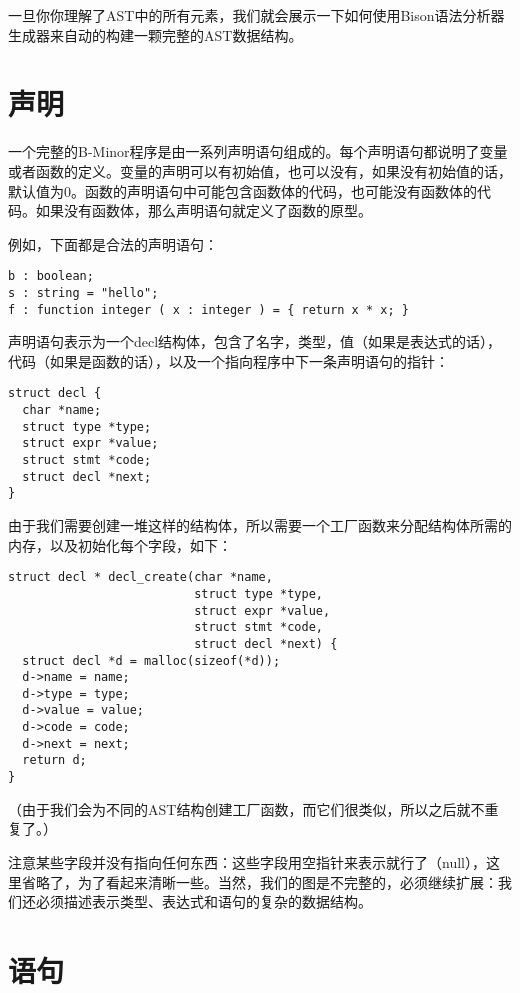 \documentclass[cn,11pt,chinese]{elegantbook}
\begin{document}
一旦你你理解了AST中的所有元素，我们就会展示一下如何使用Bison语法分析器生成器来自动的构建一颗完整的AST数据结构。

\section{声明}

一个完整的B-Minor程序是由一系列声明语句组成的。每个声明语句都说明了变量或者函数的定义。变量的声明可以有初始值，也可以没有，如果没有初始值的话，默认值为0。函数的声明语句中可能包含函数体的代码，也可能没有函数体的代码。如果没有函数体，那么声明语句就定义了函数的原型。

例如，下面都是合法的声明语句：

\begin{verbatim}
b : boolean;
s : string = "hello";
f : function integer ( x : integer ) = { return x * x; }
\end{verbatim}

声明语句表示为一个decl结构体，包含了名字，类型，值（如果是表达式的话），代码（如果是函数的话），以及一个指向程序中下一条声明语句的指针：

\begin{verbatim}
struct decl {
  char *name;
  struct type *type;
  struct expr *value;
  struct stmt *code;
  struct decl *next;
}
\end{verbatim}

由于我们需要创建一堆这样的结构体，所以需要一个工厂函数来分配结构体所需的内存，以及初始化每个字段，如下：

\begin{verbatim}
struct decl * decl_create(char *name,
                          struct type *type,
                          struct expr *value,
                          struct stmt *code,
                          struct decl *next) {
  struct decl *d = malloc(sizeof(*d));
  d->name = name;
  d->type = type;
  d->value = value;
  d->code = code;
  d->next = next;
  return d;
}
\end{verbatim}

（由于我们会为不同的AST结构创建工厂函数，而它们很类似，所以之后就不重复了。）

注意某些字段并没有指向任何东西：这些字段用空指针来表示就行了（null），这里省略了，为了看起来清晰一些。当然，我们的图是不完整的，必须继续扩展：我们还必须描述表示类型、表达式和语句的复杂的数据结构。

\section{语句}
\end{document}
